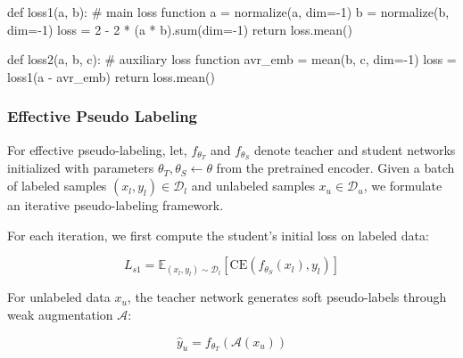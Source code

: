 \begin{algorithm}[!htbp]
\begin{algorithmic}
\State \text{}

\State \textcolor{pythonfunction}{def} loss1(a, b):  \textcolor{pythoncomment}{\# main loss function}
\State \hspace{1.1em} a = normalize(a, dim=-1)
\State \hspace{1.1em} b = normalize(b, dim=-1)
\State \hspace{1.1em} loss = 2 - 2 * (a * b).\textcolor{pythonfunction}{sum}(dim=-1) 
\State \hspace{1.1em} \textcolor{pythonfunction}{return} loss.mean()

\State \text{}

\State \textcolor{pythonfunction}{def} loss2(a, b, c): \textcolor{pythoncomment}{\# auxiliary loss function}
\State \hspace{1.1em}	avr\_emb = mean(b, c, dim=-1)
\State \hspace{1.1em} loss = loss1(a - avr\_emb)
\State \hspace{1.1em} \textcolor{pythonfunction}{return} loss.mean()
\end{algorithmic}
\end{algorithm}

\subsubsection{Effective Pseudo Labeling}  

For effective pseudo-labeling, let, $f_{\theta_T}$ and $f_{\theta_S}$ denote teacher and student networks initialized with parameters $\theta_T, \theta_S \leftarrow \theta$ from the pretrained encoder. Given a batch of labeled samples $(x_l, y_l) \in \mathcal{D}_l$ and unlabeled samples $x_u \in \mathcal{D}_u$, we formulate an iterative pseudo-labeling framework.

For each iteration, we first compute the student's initial loss on labeled data:

\begin{equation}
L_{s1} = \mathbb{E}_{(x_l,y_l)\sim\mathcal{D}_l}[\text{CE}(f_{\theta_S}(x_l), y_l)]
\end{equation}

For unlabeled data $x_u$, the teacher network generates soft pseudo-labels through weak augmentation $\mathcal{A}$:

\begin{equation}
\hat{y}_u = f_{\theta_T}(\mathcal{A}(x_u))
\end{equation}

